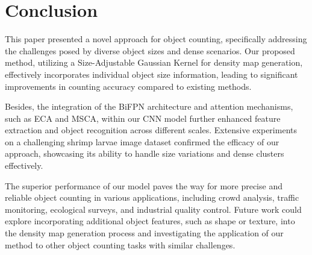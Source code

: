 \documentclass[journal]{IEEEtran}
\begin{document}
\section{Conclusion}
This paper presented a novel approach for object counting, specifically addressing the challenges posed by diverse object sizes and dense scenarios. Our proposed method, utilizing a Size-Adjustable Gaussian Kernel for density map generation, effectively incorporates individual object size information, leading to significant improvements in counting accuracy compared to existing methods.

Besides, the integration of the BiFPN architecture and attention mechanisms, such as ECA and MSCA, within our CNN model further enhanced feature extraction and object recognition across different scales. Extensive experiments on a challenging shrimp larvae image dataset confirmed the efficacy of our approach, showcasing its ability to handle size variations and dense clusters effectively.

The superior performance of our model paves the way for more precise and reliable object counting in various applications, including crowd analysis, traffic monitoring, ecological surveys, and industrial quality control. Future work could explore incorporating additional object features, such as shape or texture, into the density map generation process and investigating the application of our method to other object counting tasks with similar challenges.




\newpage

\vfill
\end{document}
